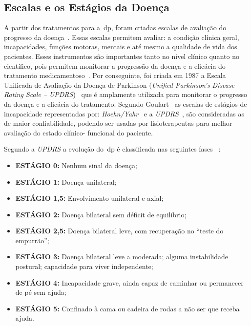 \subsection{Escalas e os Estágios da Doença}\label{section:escalas_avaliacao}
A partir dos tratamentos para a~\ac{dp}, foram criadas escalas de avaliação do progresso da doença~\cite{updrs87,Hoehn_Yahr_2001}. Essas escalas permitem avaliar: a condição clínica geral, incapacidades, funções motoras, mentais e até mesmo a qualidade de vida dos pacientes. Esses instrumentos são importantes tanto no nível clínico quanto no científico, pois permitem monitorar a progressão da doença e a eficácia do tratamento medicamentoso~\cite{updrs87,goul05}.  Por conseguinte, foi criada em 1987 a Escala Unificada de Avaliação da  Doença de Parkinson (\textit{Unified Parkinson’s Disease Rating Scale – UPDRS})~\cite{updrs87} que é amplamente utilizada para monitorar o progresso da doença e a eficácia do tratamento. Segundo Goulart~\cite{goul05} as escalas de estágios de incapacidade representadas por: \textit{Hoehn/Yahr}~\cite{Hoehn_Yahr_2001} e a \textit{UPDRS}~\cite{updrs87}, são consideradas as de maior confiabilidade, podendo ser usadas por fisioterapeutas para melhor avaliação do estado clínico-
funcional do  paciente.%

Segundo a \textit{UPDRS} a evolução do~\ac{dp} é classificada nas seguintes fases ~\cite{updrs87}:
  \begin{itemize}
    \item \textbf{ESTÁGIO 0:} Nenhum sinal da doença;
    \item \textbf{ESTÁGIO 1:} Doença unilateral;
    \item \textbf{ESTÁGIO 1,5:} Envolvimento unilateral e axial;
    \item \textbf{ESTÁGIO 2:} Doença bilateral sem déficit de equilíbrio;
    \item \textbf{ESTÁGIO 2,5:} Doença bilateral leve, com recuperação no “teste do empurrão”;
    \item \textbf{ESTÁGIO 3:} Doença bilateral leve a moderada; alguma instabilidade postural; capacidade para viver independente;
    \item \textbf{ESTÁGIO 4:} Incapacidade grave, ainda capaz de caminhar ou permanecer de pé sem ajuda;
    \item \textbf{ESTÁGIO 5:} Confinado à cama ou cadeira de rodas a não ser que receba ajuda.
  \end{itemize}

